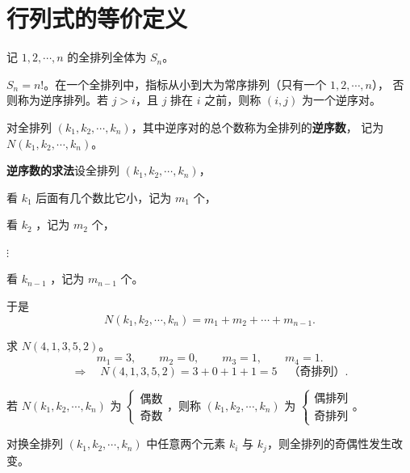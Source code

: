 \section{行列式的等价定义}

\begin{definition}
记 $1,2,\cdots,n$ 的全排列全体为 $S_n$。
\end{definition}

$S_n=n!$。在一个全排列中，指标从小到大为常序排列（只有一个 $1,2,\cdots,n$），
否则称为逆序排列。若 $j>i$，且 $j$ 排在 $i$ 之前，则称 $(i,j)$ 为一个逆序对。

\begin{sloppypar}
对全排列 $(k_1,k_2,\cdots,k_n)$，其中逆序对的总个数称为全排列的\textbf{逆序数}，
记为 $N(k_1,k_2,\cdots,k_n)$。
\end{sloppypar}

\textbf{逆序数的求法}\quad 设全排列 $(k_1,k_2,\cdots,k_n)$，

看 $k_1$ 后面有几个数比它小，记为 $m_1$ 个，

看 $k_2$ \underline{\hspace{4.5cm}}，记为 $m_2$ 个，

$\vdots$

看 $k_{n-1}$ \underline{\hspace{4.5cm}}，记为 $m_{n-1}$ 个。


于是
\[
N(k_1,k_2,\cdots,k_n)=m_1+m_2+\cdots+m_{n-1}.
\]

\begin{example}
求 $N(4,1,3,5,2)$。
\[
m_1=3,\qquad m_2=0,\qquad m_3=1,\qquad m_4=1 .
\]
\[
\Rightarrow\quad N(4,1,3,5,2)=3+0+1+1=5\quad\text{（奇排列）}.
\]
\end{example}

\begin{definition}
若 $N(k_1,k_2,\cdots,k_n)$ 为
$\begin{cases}\text{偶数}\\[2pt]\text{奇数}\end{cases}$，则称 $(k_1,k_2,\cdots,k_n)$ 为
$\begin{cases}\text{偶排列}\\[2pt]\text{奇排列}\end{cases}$。
\end{definition}

\begin{lemma}
对换全排列 $(k_1,k_2,\cdots,k_n)$ 中任意两个元素 $k_i$ 与 $k_j$，则全排列的奇偶性发生改变。
\end{lemma}

